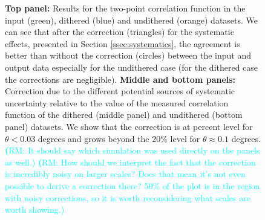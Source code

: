 \documentclass[twocolumn]{aastex62}
\newcommand{\rachel}[1]{{\textcolor{cyan}{{\textbf (RM: #1)}}}}
\begin{document}
\begin{figure}
\caption{{\bf Top panel:} Results for the two-point correlation function in the input (green), dithered (blue) and undithered (orange) datasets. We can see that after the correction (triangles) for the systematic effects, presented in Section \ref{ssec:systematics}, the agreement is better than without the correction (circles) between the input and output data especially for the undithered case (for the dithered case the corrections are negligible). {\bf Middle and bottom panels:} Correction due to the different potential sources of systematic uncertainty relative to the value of the measured correlation function of the dithered (middle panel) and undithered (bottom panel) datasets. We show that the correction is at percent level for $\theta<0.03$ degrees and grows beyond the $20\%$ level for $\theta \approx 0.1$ degrees. \rachel{It should say which simulation was used directly on the panels as well.} \rachel{How should we interpret the fact that the correction is incredibly noisy on larger scales?  Does that mean it's not even possible to derive  a correction there?  50\% of the plot is in the region with noisy corrections, so it is worth reconsidering what scales are worth showing.}}
\label{fig:2pt_corr}
\end{figure}




\end{document}
